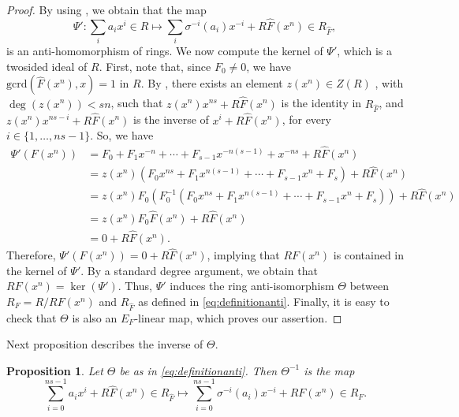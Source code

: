 \documentclass[a4paper, 11pt]{article}
\newtheorem{proposition}[theorem]{Proposition}
\newcommand{\gcrd}{\mathrm{gcrd}}
\begin{document}
\begin{proof}
    By using , we obtain that the map
\[
    \Psi': \sum_ia_ix^i \in R \longmapsto \sum_i \sigma^{-i}(a_i)x^{-i} + R\hat{F}(x^n) \in R_{\hat{F}},
    \]
    is an anti-homomorphism of rings. We now compute the kernel of $\Psi'$, which is a twosided ideal of $R$. First, note that, since $F_0 \neq 0$, we have $\gcrd(\hat{F}(x^n), x) = 1$ in $R$. By , there exists an element $z(x^n) \in Z(R)$ , with $\deg(z(x^n))<sn$, such that $z(x^n)x^{ns}+R\hat{F}(x^n)$ is the identity in $R_{\hat{F}}$, and $z(x^n)x^{ns-i}+R\hat{F}(x^n)$ is the inverse of $x^i+R\hat{F}(x^n)$, for every $i \in \{1,\ldots,ns-1\}$. So, we have
    \[
    \begin{split}
         \Psi'(F(x^n))& =F_0+F_1x^{-n}+\cdots+F_{s-1}x^{-n(s-1)}+x^{-ns} +R\hat{F}(x^n) \\
         & = z(x^n)(F_0x^{ns}+F_1x^{n(s-1)}+\cdots+F_{s-1}x^{n}+F_s) +R\hat{F}(x^n) \\
         & = z(x^n) F_0 (F_0^{-1}(F_0x^{ns}+F_1x^{n(s-1)}+\cdots+F_{s-1}x^{n}+F_s)) +R\hat{F}(x^n) \\
         & = z(x^n) F_0 \hat{F}(x^n) +R\hat{F}(x^n) \\
         & =0+R\hat{F}(x^n).
    \end{split}
    \]
    Therefore, $\Psi'(F(x^n)) = 0 + R \hat{F}(x^n)$, implying that $R F(x^n)$ is contained in the kernel of $\Psi'$. By a standard degree argument, we obtain that $R F(x^n) = \ker(\Psi')$. Thus, $\Psi'$ induces the ring anti-isomorphism $\Theta$ between $R_F = R / R F(x^n)$ and $R_{\hat{F}}$ as defined in \eqref{eq:definitionanti}. Finally, it is easy to check that $\Theta$ is also an $E_F$-linear map, which proves our assertion.
\end{proof}

Next proposition describes the inverse of $\Theta$. 

\begin{proposition} \label{prop:inverseTheta}
Let $\Theta$ be as in \eqref{eq:definitionanti}. Then $\Theta^{-1}$ is the map
     \begin{equation} \label{eq:inversetheta}
     \sum_{i=0}^{ns-1}a_ix^i+R\hat{F}(x^n) \in R_{\hat{F}} \longmapsto \sum_{i=0}^{ns-1} \sigma^{-i}(a_i)x^{-i} + RF(x^n) \in R_{F}.
     \end{equation}
\end{proposition}
\end{document}

